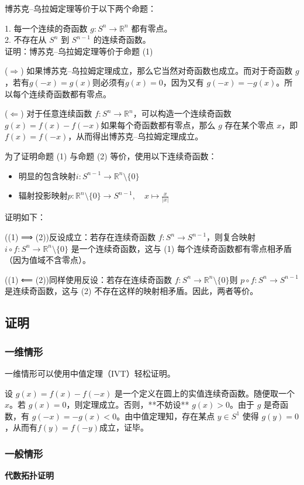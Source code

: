 博苏克–乌拉姆定理等价于以下两个命题：

1. 每一个连续的奇函数 $g : S^n \to \mathbb{R}^n$ 都有零点。\\
2. 不存在从 $S^n$ 到 $S^{n-1}$ 的连续奇函数。\\

证明：博苏克–乌拉姆定理等价于命题 (1)

($\Longrightarrow$) 如果博苏克–乌拉姆定理成立，那么它当然对奇函数也成立。而对于奇函数 $g$，若有$g(-x) = g(x)$则必须有$g(x) = 0$，因为又有 $g(-x) = -g(x)$。所以每个连续奇函数都有零点。

($\Longleftarrow$) 对于任意连续函数 $f : S^n \to \mathbb{R}^n$，可以构造一个连续奇函数$g(x) = f(x) - f(-x)$如果每个奇函数都有零点，那么 $g$ 存在某个零点 $x$，即$f(x) = f(-x)$，从而得出博苏克–乌拉姆定理成立。

为了证明命题 (1) 与命题 (2) 等价，使用以下连续奇函数：

\begin{itemize}
\item 明显的包含映射$i : S^{n-1} \to \mathbb{R}^n \setminus \{0\}$
\item 辐射投影映射$p : \mathbb{R}^n \setminus \{0\} \to S^{n-1}, \quad x \mapsto \frac{x}{|x|}$
\end{itemize}
证明如下：

((1) ⟹ (2))反设成立：若存在连续奇函数 $f : S^n \to S^{n-1}$，则复合映射 $i \circ f : S^n \to \mathbb{R}^n \setminus \{0\}$ 是一个连续奇函数，这与 (1) 每个连续奇函数都有零点相矛盾（因为值域不含零点）。

((1) ⟸ (2))同样使用反设：若存在连续奇函数 $f : S^n \to \mathbb{R}^n \setminus \{0\}$则 $p \circ f : S^n \to S^{n-1}$ 是连续奇函数，这与 (2) 不存在这样的映射相矛盾。因此，两者等价。
\subsection{证明}
\subsubsection{一维情形}
一维情形可以使用中值定理（IVT）轻松证明。

设 $g(x) = f(x) - f(-x)$ 是一个定义在圆上的实值连续奇函数。随便取一个 $x$。若 $g(x) = 0$，则定理成立。否则，**不妨设** $g(x) > 0$。由于 $g$ 是奇函数，有 $g(-x) = -g(x) < 0$。由中值定理知，存在某点 $y \in S^1$ 使得 $g(y) = 0$，从而有$f(y) = f(-y)$成立，证毕。
\subsubsection{一般情形}
\textbf{代数拓扑证明}

